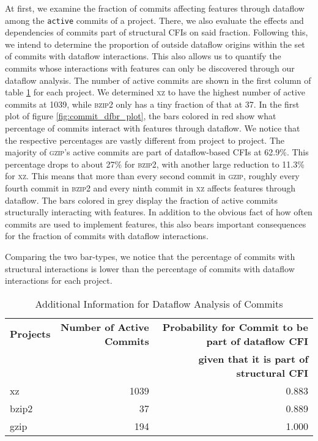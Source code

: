 At first, we examine the fraction of commits affecting features through dataflow among the \texttt{active} commits of a project.
There, we also evaluate the effects and dependencies of commits part of structural CFIs on said fraction.
Following this, we intend to determine the proportion of outside dataflow origins within the set of commits with dataflow interactions.
This also allows us to quantify the commits whose interactions with features can only be discovered through our dataflow analysis.
The number of active commits are shown in the first column of table \ref{tab:commit_dfbr_table} for each project.
We determined \textsc{xz} to have the highest number of active commits at 1039, while \textsc{bzip2} only has a tiny fraction of that at 37.
In the first plot of figure \ref{fig:commit_dfbr_plot}, the bars colored in red show what percentage of commits interact with features through dataflow.
We notice that the respective percentages are vastly different from project to project.
The majority of \textsc{gzip}'s active commits are part of dataflow-based CFIs at 62.9\%.
This percentage drops to about 27\% for \textsc{bzip2}, with another large reduction to 11.3\% for \textsc{xz}.
This means that more than every second commit in \textsc{gzip}, roughly every fourth commit in \textsc{bzip2} and every ninth commit in \textsc{xz} affects features through dataflow.
The bars colored in grey display the fraction of active commits structurally interacting with features.
In addition to the obvious fact of how often commits are used to implement features, this also bears important consequences for the fraction of commits with dataflow interactions.
\iffalse
The more commits are part of structural CFIs, the more of the code contributed by them and therefore the overall code of a project will be part of feature regions.
Logically, the accuracy of this estimation depends on many factors, such as the extend to which commits contributing code to features, also contribute code to other parts of a program.
Still, given the large disparity in the percentage of commits with structural interactions, we can be relatively certain that \textsc{xz} has the lowest proportion and \textsc{gzip} the largest proportion of feature-code with \textsc{bzip2} somewhere inbetween.
\fi
Comparing the two bar-types, we notice that the percentage of commits with structural interactions is lower than the percentage of commits with dataflow interactions for each project. \\
\begin{table}[t]
\caption{Additional Information for Dataflow Analysis of Commits}
\label{tab:commit_dfbr_table}
\centering
\begin{tabular}{l r r}
\toprule
\textbf{Projects} & \textbf{Number of Active Commits} & \textbf{Probability for Commit to be part of dataflow CFI} \\ 
 		  & 			     	      & \textbf{given that it is part of structural CFI} \\
\midrule
  xz    & 1039 & 0.883 \\
  bzip2 & 37 & 0.889 \\
  gzip  & 194 & 1.000 \\
\bottomrule
\end{tabular}
\end{table}
